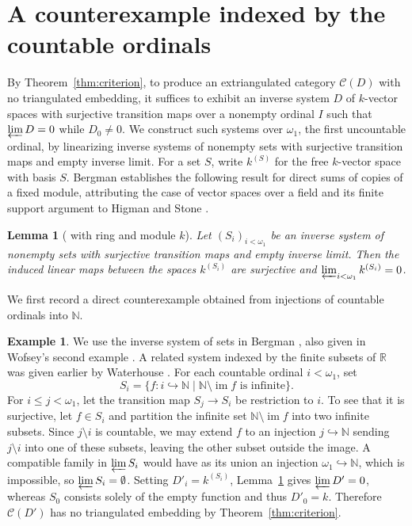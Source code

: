 \documentclass[a4paper,reqno,10pt]{amsart}
\numberwithin{equation}{section}
\newtheorem{lemma}[theorem]{Lemma}
\theoremstyle{definition}
\newtheorem{example}[theorem]{Example}
\newcommand{\C}{\mathcal C}
\DeclareMathOperator{\im}{im}
\begin{document}
\section{A counterexample indexed by the countable ordinals}\label{sec:example}

By Theorem~\ref{thm:criterion}, to produce an extriangulated category $\C(D)$
with no triangulated embedding, it suffices to exhibit an inverse system $D$ of
$k$-vector spaces with surjective transition maps over a nonempty ordinal $I$
such that $\varprojlim D=0$ while $D_0\ne 0$. We construct such systems over
$\omega_1$, the first uncountable ordinal, by linearizing inverse systems of
nonempty sets with surjective transition maps and empty inverse limit. For a
set $S$, write $k^{(S)}$ for the free $k$-vector space with basis $S$. Bergman
\cite[Lemma~3]{Be} establishes the following result for direct sums of copies
of a fixed module, attributing the case of vector spaces over a field and its
finite support argument to Higman and Stone \cite[\S3]{HS}.

\begin{lemma}[{\cite[Lemma~3]{Be} with ring and module $k$}]\label{lem:linear}
Let $(S_i)_{i<\omega_1}$ be an inverse system of nonempty sets with
surjective transition maps and empty inverse limit. Then the induced
linear maps between the spaces $k^{(S_i)}$ are surjective and
$\varprojlim_{i<\omega_1} k^{(S_i)}=0$.
\end{lemma}

We first record a direct counterexample obtained from injections of countable
ordinals into $\mathbb N$.

\begin{example}\label{ex:injections}
We use the inverse system of sets in Bergman \cite[p.~7, Example~1 in
the proof of Lemma~10]{Be2}, also given in Wofsey's second example
\cite{Wo}. A related system indexed by the finite subsets of $\mathbb R$ was given earlier
by Waterhouse \cite{Wa}. For each countable ordinal $i<\omega_1$, set
\[
 S_i=\{f:i\hookrightarrow\mathbb N\mid\mathbb N\setminus\im f
                                    \text{ is infinite}\}.
\]
For $i\le j<\omega_1$, let the transition map $S_j\to S_i$ be restriction to
$i$. To see that it is surjective, let $f\in S_i$ and partition the infinite
set $\mathbb N\setminus\im f$ into two infinite subsets. Since $j\setminus i$
is countable, we may extend $f$ to an injection $j\hookrightarrow\mathbb N$
sending $j\setminus i$ into one of these subsets, leaving the other subset
outside the image. A compatible family in $\varprojlim S_i$ would have as its
union an injection $\omega_1\hookrightarrow\mathbb N$, which is impossible, so
$\varprojlim S_i=\emptyset$. Setting $D'_i=k^{(S_i)}$, Lemma~\ref{lem:linear}
gives $\varprojlim D'=0$, whereas $S_0$ consists solely of the empty function
and thus $D'_0=k$. Therefore $\C(D')$ has no triangulated embedding by
Theorem~\ref{thm:criterion}.
\end{example}
\end{document}
